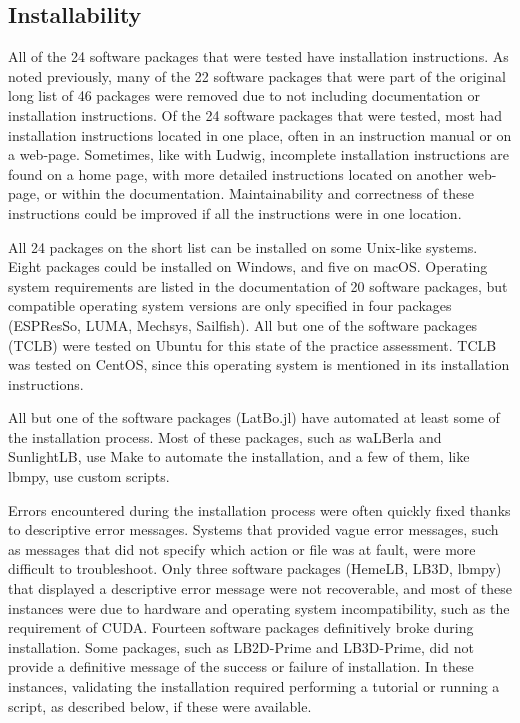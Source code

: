 \documentclass[final, 3p, times, authoryear]{elsarticle}
\begin{document}
\subsection{Installability}

All of the 24 software packages that were tested have installation instructions.
As noted previously, many of the 22 software packages that were part of the
original long list of 46 packages were removed due to not including
documentation or installation instructions. Of the 24 software packages that
were tested, most had installation instructions located in one place, often in
an instruction manual or on a web-page. Sometimes, like with Ludwig, incomplete
installation instructions are found on a home page, with more detailed
instructions located on another web-page, or within the documentation.
Maintainability and correctness of these instructions could be improved if all
the instructions were in one location. 

All 24 packages on the short list can be installed on some Unix-like systems.
Eight packages could be installed on Windows, and five on macOS. Operating
system requirements are listed in the documentation of 20 software packages, but
compatible operating system versions are only specified in four packages
(ESPResSo, LUMA, Mechsys, Sailfish). All but one of the software packages (TCLB)
were tested on Ubuntu for this state of the practice assessment. TCLB was tested
on CentOS, since this operating system is mentioned in its installation
instructions.

All but one of the software packages (LatBo.jl) have automated at least some of
the installation process. Most of these packages, such as waLBerla and
SunlightLB, use Make to automate the installation, and a few of them, like
lbmpy, use custom scripts.

Errors encountered during the installation process were often quickly fixed
thanks to descriptive error messages. Systems that provided vague error
messages, such as messages that did not specify which action or file was at
fault, were more difficult to troubleshoot. Only three software packages
(HemeLB, LB3D, lbmpy) that displayed a descriptive error message were not
recoverable, and most of these instances were due to hardware and operating
system incompatibility, such as the requirement of CUDA. Fourteen software
packages definitively broke during installation. Some packages, such as
LB2D-Prime and LB3D-Prime, did not provide a definitive message of the success
or failure of installation. In these instances, validating the installation
required performing a tutorial or running a script, as described below, if these
were available. 
\end{document}
